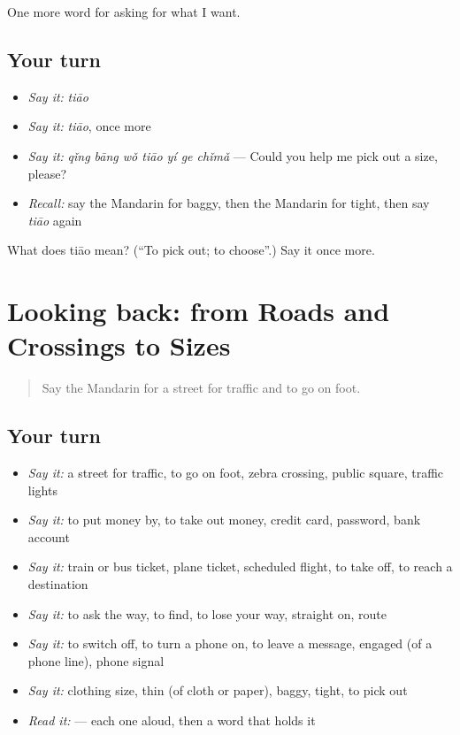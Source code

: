 \begin{grammarlens}[title={What you've built}]
One more word for asking for what I want.
\end{grammarlens}

\subsection*{Your turn}
\begin{itemize}
\raggedright
  \item \emph{Say it:} \emph{tiāo}
  \item \emph{Say it:} \emph{tiāo}, once more
  \item \emph{Say it:} \emph{qǐng bāng wǒ tiāo yí ge chǐmǎ} — Could you help me pick out a size, please?
  \item \emph{Recall:} say the Mandarin for baggy, then the Mandarin for tight, then say \emph{tiāo} again
\end{itemize}

\begin{tcolorbox}[breakable,colback=teal!4,colframe=teal!35!black,title={Before you move on}]
What does tiāo mean? (\textquotedblleft{}To pick out; to choose\textquotedblright{}.) Say it once more.
\end{tcolorbox}
\section[(dialogue)]{Looking back: from Roads and Crossings to Sizes}

\label{lesson:ZH-R199-review-194-199}



\begin{quote}
Say the Mandarin for a street for traffic and to go on foot.
\end{quote}

\subsection*{Your turn}
\begin{itemize}
\raggedright
  \item \emph{Say it:} a street for traffic, to go on foot, zebra crossing, public square, traffic lights
  \item \emph{Say it:} to put money by, to take out money, credit card, password, bank account
  \item \emph{Say it:} train or bus ticket, plane ticket, scheduled flight, to take off, to reach a destination
  \item \emph{Say it:} to ask the way, to find, to lose your way, straight on, route
  \item \emph{Say it:} to switch off, to turn a phone on, to leave a message, engaged (of a phone line), phone signal
  \item \emph{Say it:} clothing size, thin (of cloth or paper), baggy, tight, to pick out
  \item \emph{Read it:}     — each one aloud, then a word that holds it
\end{itemize}

